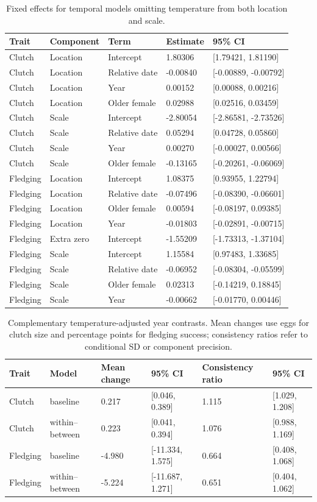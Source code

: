 \documentclass{article}
\begin{document}
\begin{table}[!ht]\centering\scriptsize\singlespacing
\caption{Fixed effects for temporal models omitting temperature from both location and scale.}\label{tab:temporal-without-temperature}
\begin{tabular}{lllll}\toprule
Trait & Component & Term & Estimate & 95\% CI\\\midrule
Clutch & Location & Intercept & 1.80306 & [1.79421, 1.81190]\\
Clutch & Location & Relative date & -0.00840 & [-0.00889, -0.00792]\\
Clutch & Location & Year & 0.00152 & [0.00088, 0.00216]\\
Clutch & Location & Older female & 0.02988 & [0.02516, 0.03459]\\
Clutch & Scale & Intercept & -2.80054 & [-2.86581, -2.73526]\\
Clutch & Scale & Relative date & 0.05294 & [0.04728, 0.05860]\\
Clutch & Scale & Year & 0.00270 & [-0.00027, 0.00566]\\
Clutch & Scale & Older female & -0.13165 & [-0.20261, -0.06069]\\
Fledging & Location & Intercept & 1.08375 & [0.93955, 1.22794]\\
Fledging & Location & Relative date & -0.07496 & [-0.08390, -0.06601]\\
Fledging & Location & Older female & 0.00594 & [-0.08197, 0.09385]\\
Fledging & Location & Year & -0.01803 & [-0.02891, -0.00715]\\
Fledging & Extra zero & Intercept & -1.55209 & [-1.73313, -1.37104]\\
Fledging & Scale & Intercept & 1.15584 & [0.97483, 1.33685]\\
Fledging & Scale & Relative date & -0.06952 & [-0.08304, -0.05599]\\
Fledging & Scale & Older female & 0.02313 & [-0.14219, 0.18845]\\
Fledging & Scale & Year & -0.00662 & [-0.01770, 0.00446]\\
\bottomrule\end{tabular}\end{table}
\begin{table}[!ht]\centering\scriptsize\singlespacing
\caption{Complementary temperature-adjusted year contrasts. Mean changes use eggs for clutch size and percentage points for fledging success; consistency ratios refer to conditional SD or component precision.}\label{tab:adjusted-year}
\begin{tabular}{llllll}\toprule
Trait & Model & Mean change & 95\% CI & Consistency ratio & 95\% CI\\\midrule
Clutch & baseline & 0.217 & [0.046, 0.389] & 1.115 & [1.029, 1.208]\\
Clutch & within--between & 0.223 & [0.041, 0.394] & 1.076 & [0.988, 1.169]\\
Fledging & baseline & -4.980 & [-11.334, 1.575] & 0.664 & [0.408, 1.068]\\
Fledging & within--between & -5.224 & [-11.687, 1.271] & 0.651 & [0.404, 1.062]\\
\bottomrule\end{tabular}\end{table}
\end{document}
